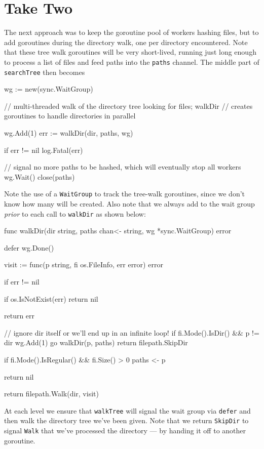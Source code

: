 \documentclass[12pt,notitlepage]{article}
\begin{document}
\section{Take Two}
The next approach was to keep the goroutine pool of workers hashing files, but to
add goroutines during the directory walk, one per directory encountered. Note that
these tree walk goroutines will be very short-lived, running just long enough to
process a list of files and feed paths into the \verb|paths| channel. The middle
part of \verb|searchTree| then becomes

\begin{golang}
    wg := new(sync.WaitGroup)

	// multi-threaded walk of the directory tree looking for files; walkDir
	// creates goroutines to handle directories in parallel

	wg.Add(1)
	err := walkDir(dir, paths, wg)

	if err != nil {
		log.Fatal(err)
	}

	// signal no more paths to be hashed, which will eventually stop all workers
	wg.Wait()
	close(paths)
\end{golang}

Note the use of a \verb|WaitGroup| to track the tree-walk goroutines, since we
don't know how many will be created. Also note that we always add to the wait
group {\em prior} to each call to \verb|walkDir| as shown below:

\begin{golang}
func walkDir(dir string, paths chan<- string, wg *sync.WaitGroup) error {
	defer wg.Done()

	visit := func(p string, fi os.FileInfo, err error) error {
		if err != nil {
			if os.IsNotExist(err) {
				return nil
			}

			return err
		}

        // ignore dir itself or we'll end up in an infinite loop!
		if fi.Mode().IsDir() && p != dir {
			wg.Add(1)
			go walkDir(p, paths)
			return filepath.SkipDir
		}

		if fi.Mode().IsRegular() && fi.Size() > 0 {
			paths <- p
		}

		return nil
	}

	return filepath.Walk(dir, visit)
}
\end{golang}

At each level we ensure that \verb|walkTree| will signal the wait group via
\verb|defer| and then walk the directory tree we've been given. Note that we return
\verb|SkipDir| to signal \verb|Walk| that we've processed the directory --- by
handing it off to another goroutine.
\end{document}
